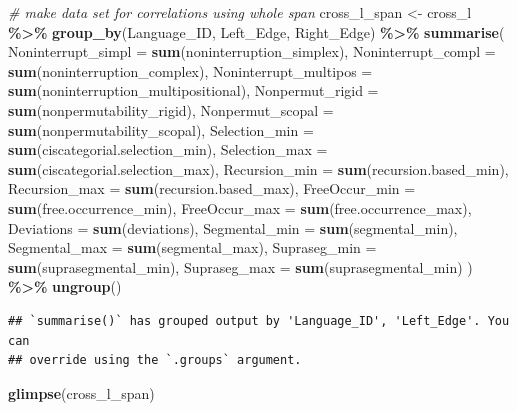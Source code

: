\documentclass[
]{article}
\newenvironment{Shaded}{\begin{snugshade}}{\end{snugshade}}
\newcommand{\AttributeTok}[1]{\textcolor[rgb]{0.13,0.29,0.53}{#1}}
\newcommand{\CommentTok}[1]{\textcolor[rgb]{0.56,0.35,0.01}{\textit{#1}}}
\newcommand{\FunctionTok}[1]{\textcolor[rgb]{0.13,0.29,0.53}{\textbf{#1}}}
\newcommand{\NormalTok}[1]{#1}
\newcommand{\OtherTok}[1]{\textcolor[rgb]{0.56,0.35,0.01}{#1}}
\newcommand{\SpecialCharTok}[1]{\textcolor[rgb]{0.81,0.36,0.00}{\textbf{#1}}}
\begin{document}
\begin{Shaded}
\begin{Highlighting}[]
\CommentTok{\# make data set for correlations using whole span}
\NormalTok{cross\_l\_span }\OtherTok{\textless{}{-}}\NormalTok{ cross\_l }\SpecialCharTok{\%\textgreater{}\%}
  \FunctionTok{group\_by}\NormalTok{(Language\_ID, Left\_Edge, Right\_Edge) }\SpecialCharTok{\%\textgreater{}\%}
  \FunctionTok{summarise}\NormalTok{(}
    \AttributeTok{Noninterrupt\_simpl =} \FunctionTok{sum}\NormalTok{(noninterruption\_simplex),}
    \AttributeTok{Noninterrupt\_compl =} \FunctionTok{sum}\NormalTok{(noninterruption\_complex),}
    \AttributeTok{Noninterrupt\_multipos =} \FunctionTok{sum}\NormalTok{(noninterruption\_multipositional),}
    \AttributeTok{Nonpermut\_rigid =} \FunctionTok{sum}\NormalTok{(nonpermutability\_rigid),}
    \AttributeTok{Nonpermut\_scopal =} \FunctionTok{sum}\NormalTok{(nonpermutability\_scopal),}
    \AttributeTok{Selection\_min =} \FunctionTok{sum}\NormalTok{(ciscategorial.selection\_min),}
    \AttributeTok{Selection\_max =} \FunctionTok{sum}\NormalTok{(ciscategorial.selection\_max),}
    \AttributeTok{Recursion\_min =} \FunctionTok{sum}\NormalTok{(recursion.based\_min),}
    \AttributeTok{Recursion\_max =} \FunctionTok{sum}\NormalTok{(recursion.based\_max),}
    \AttributeTok{FreeOccur\_min =} \FunctionTok{sum}\NormalTok{(free.occurrence\_min),}
    \AttributeTok{FreeOccur\_max =} \FunctionTok{sum}\NormalTok{(free.occurrence\_max),}
    \AttributeTok{Deviations =} \FunctionTok{sum}\NormalTok{(deviations),}
    \AttributeTok{Segmental\_min =} \FunctionTok{sum}\NormalTok{(segmental\_min),}
    \AttributeTok{Segmental\_max =} \FunctionTok{sum}\NormalTok{(segmental\_max),}
    \AttributeTok{Supraseg\_min =} \FunctionTok{sum}\NormalTok{(suprasegmental\_min),}
    \AttributeTok{Supraseg\_max =} \FunctionTok{sum}\NormalTok{(suprasegmental\_min)}
\NormalTok{  ) }\SpecialCharTok{\%\textgreater{}\%}
  \FunctionTok{ungroup}\NormalTok{()}
\end{Highlighting}
\end{Shaded}

\begin{verbatim}
## `summarise()` has grouped output by 'Language_ID', 'Left_Edge'. You can
## override using the `.groups` argument.
\end{verbatim}

\begin{Shaded}
\begin{Highlighting}[]
\FunctionTok{glimpse}\NormalTok{(cross\_l\_span)}
\end{Highlighting}
\end{Shaded}
\end{document}
